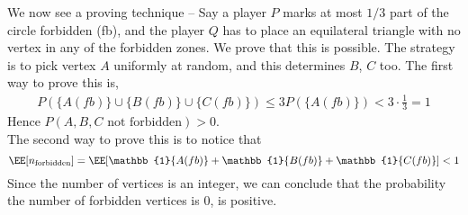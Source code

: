 We now see a proving technique -- Say a player $P$ marks at most $1/3$ part of the circle forbidden (fb), and the player $Q$ has to place an equilateral triangle with no vertex in any of the forbidden zones. We prove that this is possible. The strategy is to pick vertex $A$ uniformly at random, and this determines $B$, $C$ too. The first way to prove this is,
\begin{align*}
    P(\{A (fb)\} \cup \{B (fb)\} \cup \{C (fb)\}) \leq 3P(\{A (fb)\}) < 3 \cdot \frac13 = 1
\end{align*}
Hence $P(A,B,C \text{ not forbidden}) > 0$.\\
The second way to prove this is to notice that
\[\EE[n_{\text{forbidden}}] = \EE[\mathbb{1}\{A(fb)\}+\mathbb{1}\{B(fb)\}+\mathbb{1}\{C(fb)\}] < 1 \]
Since the number of vertices is an integer, we can conclude that the probability the number of forbidden vertices is 0, is positive.